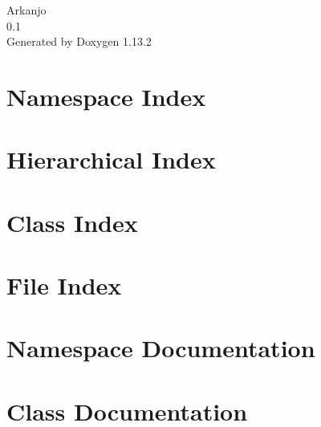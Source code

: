 \documentclass[twoside]{book}
\newcommand{\+}{\discretionary{\mbox{\scriptsize$\hookleftarrow$}}{}{}}
\newcommand{\clearemptydoublepage}{%
    \newpage{\pagestyle{empty}\cleardoublepage}%
  }
\begin{document}
  \raggedbottom
    \hypersetup{pageanchor=false,
                bookmarksnumbered=true,
                pdfencoding=unicode
               }
  \begin{titlepage}
  \vspace*{7cm}
  \begin{center}%
  {\Large Arkanjo}\\
  [1ex]\large 0.\+1 \\
  \vspace*{1cm}
  {\large Generated by Doxygen 1.13.2}\\
  \end{center}
  \end{titlepage}
  \clearemptydoublepage
  \tableofcontents
  \clearemptydoublepage
  \hypersetup{pageanchor=true}


\chapter{Namespace Index}

\chapter{Hierarchical Index}

\chapter{Class Index}

\chapter{File Index}

\chapter{Namespace Documentation}






\chapter{Class Documentation}























\end{document}

